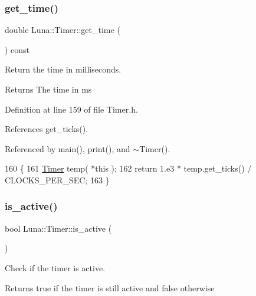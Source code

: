 \subsubsection{\texorpdfstring{get\+\_\+time()}{get\_time()}}
{\footnotesize\ttfamily double Luna\+::\+Timer\+::get\+\_\+time (\begin{DoxyParamCaption}{ }\end{DoxyParamCaption}) const\hspace{0.3cm}{\ttfamily [inline]}}



Return the time in milliseconds. 

\begin{DoxyReturn}{Returns}
The time in ms 
\end{DoxyReturn}


Definition at line 159 of file Timer.\+h.



References get\+\_\+ticks().



Referenced by main(), print(), and $\sim$\+Timer().


\begin{DoxyCode}
160     \{
161         \hyperlink{classLuna_1_1Timer_a8505121ba140f41121a57e4404e1d251}{Timer} temp( *\textcolor{keyword}{this} );
162         \textcolor{keywordflow}{return} 1.e3 * temp.get\_ticks() / CLOCKS\_PER\_SEC;
163     \}
\end{DoxyCode}
\mbox{\label{classLuna_1_1Timer_a025d787c4a3c7cc94e920e0ae480488f}} 
\subsubsection{\texorpdfstring{is\+\_\+active()}{is\_active()}}
{\footnotesize\ttfamily bool Luna\+::\+Timer\+::is\+\_\+active (\begin{DoxyParamCaption}{ }\end{DoxyParamCaption})\hspace{0.3cm}{\ttfamily [inline]}}



Check if the timer is active. 

\begin{DoxyReturn}{Returns}
true if the timer is still active and false otherwise 
\end{DoxyReturn}


